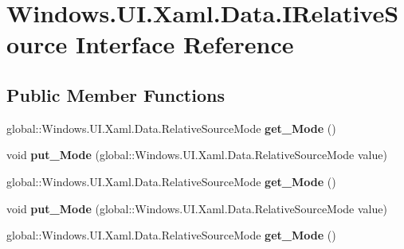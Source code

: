 \hypertarget{interface_windows_1_1_u_i_1_1_xaml_1_1_data_1_1_i_relative_source}{}\section{Windows.\+U\+I.\+Xaml.\+Data.\+I\+Relative\+Source Interface Reference}
\label{interface_windows_1_1_u_i_1_1_xaml_1_1_data_1_1_i_relative_source}
\subsection*{Public Member Functions}
\begin{DoxyCompactItemize}
\item 
\mbox{\label{interface_windows_1_1_u_i_1_1_xaml_1_1_data_1_1_i_relative_source_a03f6131f8e2b0d5d3a88a35b83713113}} 
global\+::\+Windows.\+U\+I.\+Xaml.\+Data.\+Relative\+Source\+Mode {\bfseries get\+\_\+\+Mode} ()
\item 
\mbox{\label{interface_windows_1_1_u_i_1_1_xaml_1_1_data_1_1_i_relative_source_abaa2d21450656189e0736176d6752b01}} 
void {\bfseries put\+\_\+\+Mode} (global\+::\+Windows.\+U\+I.\+Xaml.\+Data.\+Relative\+Source\+Mode value)
\item 
\mbox{\label{interface_windows_1_1_u_i_1_1_xaml_1_1_data_1_1_i_relative_source_a03f6131f8e2b0d5d3a88a35b83713113}} 
global\+::\+Windows.\+U\+I.\+Xaml.\+Data.\+Relative\+Source\+Mode {\bfseries get\+\_\+\+Mode} ()
\item 
\mbox{\label{interface_windows_1_1_u_i_1_1_xaml_1_1_data_1_1_i_relative_source_abaa2d21450656189e0736176d6752b01}} 
void {\bfseries put\+\_\+\+Mode} (global\+::\+Windows.\+U\+I.\+Xaml.\+Data.\+Relative\+Source\+Mode value)
\item 
\mbox{\label{interface_windows_1_1_u_i_1_1_xaml_1_1_data_1_1_i_relative_source_a03f6131f8e2b0d5d3a88a35b83713113}} 
global\+::\+Windows.\+U\+I.\+Xaml.\+Data.\+Relative\+Source\+Mode {\bfseries get\+\_\+\+Mode} ()

\end{DoxyCompactItemize}
